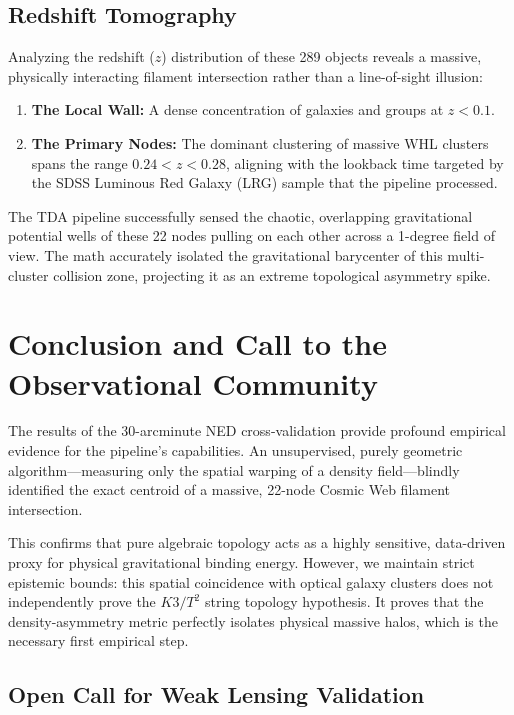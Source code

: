 \documentclass[aps,prd,twocolumn,nofootinbib,superscriptaddress,10pt]{revtex4-2}
\begin{document}
\subsection{Redshift Tomography}
Analyzing the redshift ($z$) distribution of these 289 objects reveals a massive, physically interacting filament intersection rather than a line-of-sight illusion:
\begin{enumerate}
    \item \textbf{The Local Wall:} A dense concentration of galaxies and groups at $z < 0.1$.
    \item \textbf{The Primary Nodes:} The dominant clustering of massive WHL clusters spans the range $0.24 < z < 0.28$, aligning with the lookback time targeted by the SDSS Luminous Red Galaxy (LRG) sample that the pipeline processed.
\end{enumerate}

The TDA pipeline successfully sensed the chaotic, overlapping gravitational potential wells of these 22 nodes pulling on each other across a 1-degree field of view. The math accurately isolated the gravitational barycenter of this multi-cluster collision zone, projecting it as an extreme topological asymmetry spike.

\section{Conclusion and Call to the Observational Community}

The results of the 30-arcminute NED cross-validation provide profound empirical evidence for the pipeline's capabilities. An unsupervised, purely geometric algorithm---measuring only the spatial warping of a density field---blindly identified the exact centroid of a massive, 22-node Cosmic Web filament intersection.

This confirms that pure algebraic topology acts as a highly sensitive, data-driven proxy for physical gravitational binding energy. However, we maintain strict epistemic bounds: this spatial coincidence with optical galaxy clusters does not independently prove the $K3/T^2$ string topology hypothesis. It proves that the density-asymmetry metric perfectly isolates physical massive halos, which is the necessary first empirical step.

\subsection*{Open Call for Weak Lensing Validation}
\end{document}
